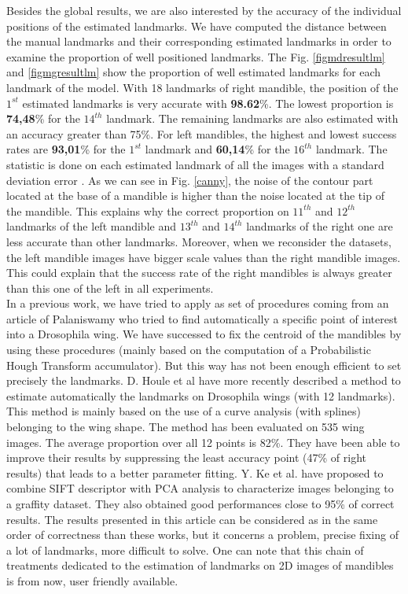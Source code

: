 \documentclass[twoside,twocolumn,10pt]{article}
\begin{document}
Besides the global results, we are also interested by the accuracy of
the individual positions of the estimated landmarks.
We have computed the distance between the manual landmarks and their
corresponding estimated landmarks in order to examine the proportion
of well positioned landmarks. The Fig. \ref{figmdresultlm} and
\ref{figmgresultlm} show the proportion of well estimated landmarks
for each landmark of the model. With 18 landmarks of right mandible,
the position of the $1^{st}$ estimated landmarks is very accurate with
\textbf{98.62}\%. The lowest proportion is \textbf{74,48}\% for the
$14^{th}$ landmark. The remaining landmarks are also estimated with an
accuracy greater than 75\%. For left mandibles, the highest and lowest success rates are
\textbf{93,01}\% for the $1^{st}$ landmark and \textbf{60,14}\% for
the $16^{th}$ landmark. The statistic is done on each estimated
landmark of all the images with a standard deviation error
\cite{bland1996statistics}. As we can see in Fig. \ref{canny}, the
noise of the contour part located at the base of a mandible is higher
than the noise located at the tip of the mandible. 
This explains why the correct proportion on $11^{th}$ and $12^{th}$
landmarks of the left mandible and $13^{th}$ and $14^{th}$ landmarks of
the right one are less accurate than other landmarks. Moreover,
when we reconsider the datasets, the left mandible images have bigger
scale values than the right mandible images. This could explain that the
success rate of the right mandibles is always greater than this one of the left
in all experiments.
\\
In  a previous work, we have tried to apply as set of procedures
coming from an article of Palaniswamy \cite{palaniswamy2010automatic} who tried to find
automatically a specific point of interest into a Drosophila wing. We
have successed to fix the centroid of the mandibles by using these
procedures (mainly based on the computation of a Probabilistic Hough
Transform accumulator). But this way has not been enough efficient to set
precisely the landmarks. D. Houle et al \cite{houle2003automated}
have more recently described a method to estimate automatically the
landmarks on Drosophila wings (with 12 landmarks). This method is
mainly based on the use of a curve analysis (with splines) belonging
to the wing shape. The method has been evaluated on 535 wing images. 
The average proportion over all 12 points is 82\%. They have been able
to improve their results by suppressing the least accuracy point (47\%
of right results) that leads to a better parameter fitting. Y. Ke et
al. \cite{ke2004pca} have proposed to combine SIFT descriptor 
with PCA analysis to characterize images belonging to a graffity
dataset. They also obtained good performances close to 95\% of correct
results. The results presented in this article can be considered as in
the same order of correctness than these works, but it concerns a problem, precise fixing of a
lot of landmarks, more difficult to solve. One can note that this chain of
treatments dedicated to the  estimation of landmarks on 2D images of
mandibles is from now, user friendly available.   
\end{document}
